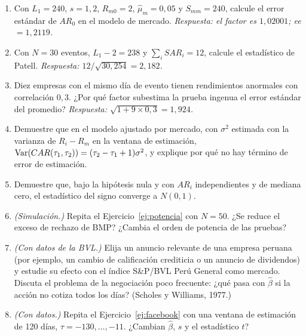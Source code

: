 \begin{enumerate}[label=\textbf{\thechapter.\arabic*},leftmargin=*,itemsep=6pt]
  \item Con $L_1=240$, $s=1{,}2$, $R_{m0}=2$, $\hat\mu_m=0{,}05$ y $S_{mm}=240$, calcule el error estándar de $AR_0$ en el modelo de
  mercado. \textit{Respuesta: el factor es $1{,}02001$; ee $=1{,}2119$.}

  \item Con $N=30$ eventos, $L_1-2=238$ y $\sum_iSAR_i=12$, calcule el estadístico de Patell. \textit{Respuesta: $12/\sqrt{30{,}254}=2{,}182$.}

  \item Diez empresas con el mismo día de evento tienen rendimientos anormales con correlación $0{,}3$. ¿Por qué factor subestima
  la prueba ingenua el error estándar del promedio? \textit{Respuesta: $\sqrt{1+9\times0{,}3}=1{,}924$.}

  \item Demuestre que en el modelo ajustado por mercado, con $\sigma^2$ estimada con la varianza de $R_i-R_m$ en la ventana de estimación,
  $\operatorname{Var}(CAR(\tau_1,\tau_2))=(\tau_2-\tau_1+1)\sigma^2$, y explique por qué no hay término de error de estimación.

  \item Demuestre que, bajo la hipótesis nula y con $AR_i$ independientes y de mediana cero, el estadístico del signo converge a
  $N(0,1)$.

  \item \emph{(Simulación.)} Repita el Ejercicio~\ref{ej:potencia} con $N=50$. ¿Se reduce el exceso de rechazo de BMP? ¿Cambia el orden de
  potencia de las pruebas?

  \item \emph{(Con datos de la BVL.)} Elija un anuncio relevante de una empresa peruana (por ejemplo, un cambio de calificación
  crediticia o un anuncio de dividendos) y estudie su efecto con el índice S\&P/BVL Perú General como mercado. Discuta el
  problema de la negociación poco frecuente: ¿qué pasa con $\hat\beta$ si la acción no cotiza todos los días? (Scholes y Williams, 1977.)

  \item \emph{(Con datos.)} Repita el Ejercicio~\ref{ej:facebook} con una ventana de estimación de 120 días, $\tau=-130,\dots,-11$. ¿Cambian
  $\hat\beta$, $s$ y el estadístico $t$?
\end{enumerate}

